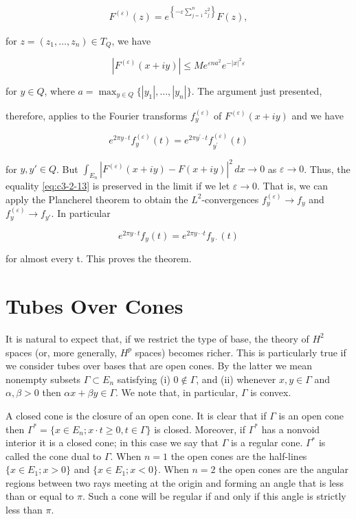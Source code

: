 \[
\begin{array}{r}{F^{(\varepsilon)}(z)=e^{\left\{-\varepsilon\displaystyle\sum_{j=1}^{n}z_{j}^{2}\right\}}F(z),}\end{array}
\]

for $z = (z_1, \ldots, z_n) \in T_Q$, we have

\[
|F^{(\varepsilon)}(x+i y)|\leq M e^{\varepsilon n a^{2}}e^{-|x|^{2}\varepsilon}
\]

for $y \in Q$, where $a = \max_{y \in Q} \{|y_1|, \ldots, |y_n|\}$. The argument just presented,

therefore, applies to the Fourier transforms $f_{y}^{(\varepsilon)}$ of $F^{(\varepsilon)}(x + iy)$ and we have

\begin{equation}\label{eq:c3-2-13}
e^{2\pi y\cdot t}f_{y}^{(\varepsilon)}(t)=e^{2\pi y^{\prime}\cdot t}f_{y^{\prime}}^{(\varepsilon)}(t)
\end{equation}

for $y, y' \in Q$. But $\int_{E_n} |F^{(\varepsilon)}(x + iy) - F(x + iy)|^2 \, dx \to 0$ as $\varepsilon \to 0$. Thus, the equality \eqref{eq:c3-2-13} is preserved in the limit if we let $\varepsilon \to 0$. That is, we can apply the Plancherel theorem to obtain the $L^2$-convergences $f_y^{(\varepsilon)} \to f_y$ and $f_y^{(\varepsilon)} \to f_{y'}$. In particular

\[
e^{2\pi y\cdot t}f_{y}(t)=e^{2\pi y\cdot\cdot t}f_{y\cdot}(t)
\]

for almost every t. This proves the theorem.

\section{Tubes Over Cones}

It is natural to expect that, if we restrict the type of base, the theory of $H^2$ spaces (or, more generally, $H^p$ spaces) becomes richer. This is particularly true if we consider tubes over bases that are open cones. By the latter we mean nonempty subsets $\Gamma \subset E_n$ satisfying (i) $0 \notin \Gamma$, and (ii) whenever $x, y \in \Gamma$ and $\alpha, \beta > 0$ then $\alpha x + \beta y \in \Gamma$. We note that, in particular, $\Gamma$ is convex.

A closed cone is the closure of an open cone. It is clear that if $\Gamma$ is an open cone then $\Gamma^* = \{x \in E_n; x \cdot t \geq 0, t \in \Gamma\}$ is closed. Moreover, if $\Gamma^*$ has a nonvoid interior it is a closed cone; in this case we say that $\Gamma$ is a regular cone. $\Gamma^*$ is called the cone dual to $\Gamma$. When $n = 1$ the open cones are the half-lines $\{x \in E_1; x > 0\}$ and $\{x \in E_1; x < 0\}$. When $n = 2$ the open cones are the angular regions between two rays meeting at the origin and forming an angle that is less than or equal to $\pi$. Such a cone will be regular if and only if this angle is strictly less than $\pi$.

